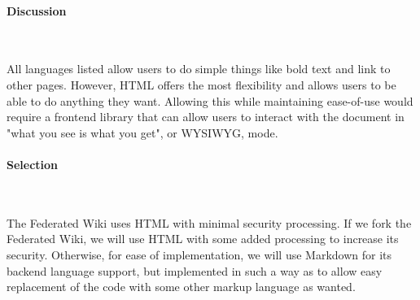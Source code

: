 \documentclass[letterpaper, 10pt, draftclsnofoot, compsoc, onecolumn]{IEEEtran}
\begin{document}
{\vspace{2mm}

\paragraph{Discussion} ~\\
{\noindent
All languages listed allow users to do simple things like bold text and link to other pages. However,
HTML offers the most flexibility and allows users to be able to do anything they want.
Allowing this while maintaining ease-of-use would require a frontend library
that can allow users to interact with the document in "what you see is what you get",
or WYSIWYG, mode.
 \par}

\medskip
\paragraph{Selection} ~\\
{\noindent
The Federated Wiki uses HTML with minimal security processing. If we fork the Federated Wiki, we will use
HTML with some added processing to increase its security. Otherwise, for ease of implementation, we will
use Markdown for its backend language support, but implemented in such a way as to allow easy
replacement of the code with some other markup language as wanted.
\par}

\newpage
\medskip
}
\end{document}
